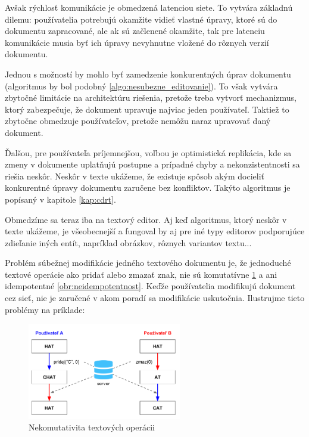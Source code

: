 Avšak rýchlosť komunikácie je obmedzená latenciou siete. To vytvára základnú dilemu: 
používatelia potrebujú okamžite vidieť vlastné úpravy, ktoré sú do dokumentu zapracované,
ale ak sú začlenené okamžite, tak pre latenciu komunikácie musia byť ich
úpravy nevyhnutne vložené do rôznych verzií dokumentu.

Jednou s možností by mohlo byť zamedzenie konkurentných úprav dokumentu (algoritmus by bol podobný
\ref{algo:nesubezne_editovanie}). To však vytvára zbytočné limitácie na architektúru riešenia,
pretože treba vytvorť mechanizmus, ktorý zabezpečuje, že dokument upravuje najviac jeden
používateľ. Taktiež to zbytočne obmedzuje používateľov, pretože nemôžu naraz
upravovať daný dokument.

Ďalšou, pre používateľa príjemnejšou, voľbou je optimistická
replikácia, kde sa zmeny v dokumente uplatňujú postupne a prípadné chyby a nekonzistentnosti sa
riešia neskôr. Neskôr v texte ukážeme, že existuje spôsob akým docieliť konkurentné úpravy 
dokumentu zaručene bez konfliktov. Takýto algoritmus je popísaný v kapitole \ref{kap:cdrt}.

Obmedzíme sa teraz iba na textový editor. Aj keď algoritmus, ktorý neskôr v texte ukážeme, je
všeobecnejší a fungoval by aj pre iné typy editorov podporujúce zdieľanie iných entít, napríklad
obrázkov, rôznych variantov textu... 

\medskip

Problém súbežnej modifikácie jedného textového dokumentu je, že jednoduché textové operácie ako
pridať alebo zmazať znak, nie sú komutatívne \ref{obr:nekomutativita} a ani 
idempotentné \ref{obr:neidempotentnost}. Keďže používatelia
modifikujú dokument cez sieť, nie je zaručené v akom poradí sa modifikácie uskutočnia. 
Ilustrujme tieto problémy na príklade:

\begin{figure}[H]
\centerline{\includegraphics[width=0.6\textwidth]{images/nekomutativne_operacie}}
\caption[Nekomutativita textových operácii]{Nekomutativita textových operácii}
\label{obr:nekomutativita}
\end{figure}

